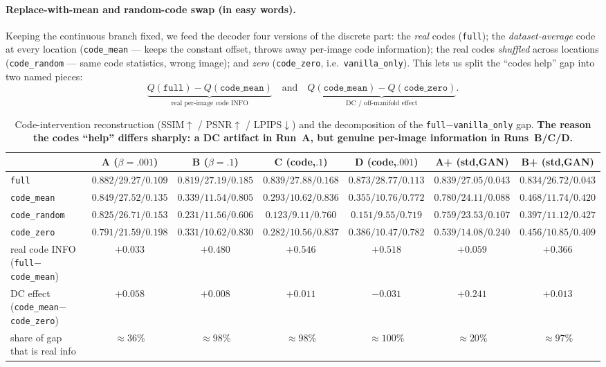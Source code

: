 \documentclass[11pt]{article}
\newcommand{\good}[1]{\textcolor{green!55!black}{#1}}
\newcommand{\bad}[1]{\textcolor{red!70!black}{#1}}
\begin{document}
\paragraph{Replace-with-mean and random-code swap (in easy words).}
Keeping the continuous branch fixed, we feed the decoder four versions of the discrete part:
the \emph{real} codes (\texttt{full}); the \emph{dataset-average} code at every location
(\texttt{code\_mean} --- keeps the constant offset, throws away per-image code information);
the real codes \emph{shuffled} across locations (\texttt{code\_random} --- same code
statistics, wrong image); and \emph{zero} (\texttt{code\_zero}, i.e.\ \texttt{vanilla\_only}).
This lets us split the ``codes help'' gap into two named pieces:
\[
\underbrace{Q(\texttt{full})-Q(\texttt{code\_mean})}_{\text{real per-image code INFO}}
\quad\text{and}\quad
\underbrace{Q(\texttt{code\_mean})-Q(\texttt{code\_zero})}_{\text{DC / off-manifold effect}} .
\]

\begin{table}[h]
\centering
\caption{Code-intervention reconstruction (SSIM$\uparrow$ / PSNR$\uparrow$ / LPIPS$\downarrow$)
and the decomposition of the \texttt{full}$-$\texttt{vanilla\_only} gap. \textbf{The reason
the codes ``help'' differs sharply: a DC artifact in Run~A, but genuine per-image information
in Runs~B/C/D.}}
\label{tab:codeinfo}
\scriptsize
\setlength{\tabcolsep}{3pt}
\begin{tabular}{lcccccc}
\toprule
 & \textbf{A} ($\beta{=}.001$) & \textbf{B} ($\beta{=}.1$) & \textbf{C} (code,$.1$) & \textbf{D} (code,$.001$) & \textbf{A+} (std,GAN) & \textbf{B+} (std,GAN)\\
\midrule
\texttt{full}         & $0.882 / 29.27 / 0.109$ & $0.819 / 27.19 / 0.185$ & $0.839 / 27.88 / 0.168$ & $0.873 / 28.77 / 0.113$ & $0.839 / 27.05 / 0.043$ & $0.834 / 26.72 / 0.043$\\
\texttt{code\_mean}   & $0.849 / 27.52 / 0.135$ & $0.339 / 11.54 / 0.805$ & $0.293 / 10.62 / 0.836$ & $0.355 / 10.76 / 0.772$ & $0.780 / 24.11 / 0.088$ & $0.468 / 11.74 / 0.420$\\
\texttt{code\_random} & $0.825 / 26.71 / 0.153$ & $0.231 / 11.56 / 0.606$ & $0.123 / 9.11 / 0.760$ & $0.151 / 9.55 / 0.719$ & $0.759 / 23.53 / 0.107$ & $0.397 / 11.12 / 0.427$\\
\texttt{code\_zero}   & $0.791 / 21.59 / 0.198$ & $0.331 / 10.62 / 0.830$ & $0.282 / 10.56 / 0.837$ & $0.386 / 10.47 / 0.782$ & $0.539 / 14.08 / 0.240$ & $0.456 / 10.85 / 0.409$\\
\midrule
real code INFO (\texttt{full}$-$\texttt{code\_mean}) & \good{$+0.033$} & \good{$+0.480$} & \good{$+0.546$} & \good{$+0.518$} & \good{$+0.059$} & \good{$+0.366$}\\
DC effect (\texttt{code\_mean}$-$\texttt{code\_zero}) & \bad{$+0.058$} & $+0.008$ & $+0.011$ & $-0.031$ & \bad{$+0.241$} & $+0.013$\\
share of gap that is real info & $\approx 36\%$ & $\approx 98\%$ & $\approx 98\%$ & $\approx 100\%$ & \bad{$\approx 20\%$} & $\approx 97\%$\\
\bottomrule
\end{tabular}
\end{table}
\end{document}
